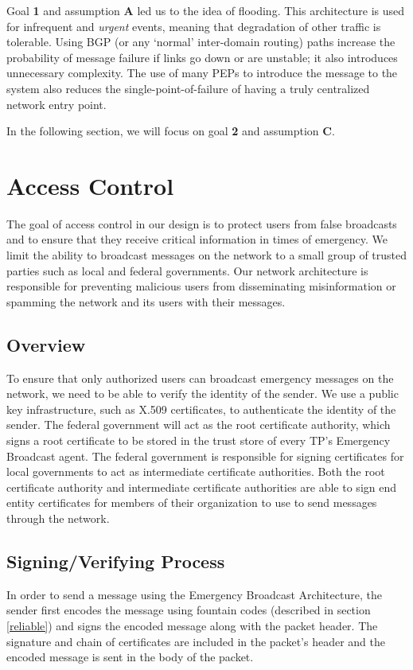 Goal \textbf{1} and assumption \textbf{A} led us to the idea of flooding. This architecture is used for infrequent and \textit{urgent} events, meaning that degradation of other traffic is tolerable. Using BGP (or any `normal' inter-domain routing) paths increase the probability of message failure if links go down or are unstable; it also introduces unnecessary complexity. The use of many PEPs to introduce the message to the system also reduces the single-point-of-failure of having a truly centralized network entry point.

In the following section, we will focus on goal \textbf{2} and assumption \textbf{C}. 

\section{Access Control}\label{acl}
The goal of access control in our design is to protect users from false broadcasts and to ensure that they receive critical information in times of emergency. We limit the ability to broadcast messages on the network to a small group of trusted parties such as local and federal governments. Our network architecture is responsible for preventing malicious users from disseminating misinformation or spamming the network and its users with their messages.
\subsection{Overview}
To ensure that only authorized users can broadcast emergency messages on the network, we need to be able to verify the identity of the sender. We use a public key infrastructure, such as X.509 certificates\cite{x509}, to authenticate the identity of the sender. The federal government will act as the root certificate authority, which signs a root certificate to be stored in the trust store of every TP's Emergency Broadcast agent. The federal government is responsible for signing certificates for local governments to act as intermediate certificate authorities. Both the root certificate authority and intermediate certificate authorities are able to sign end entity certificates for members of their organization to use to send messages through the network.
\subsection{Signing/Verifying Process}
In order to send a message using the Emergency Broadcast Architecture, the sender first encodes the message using fountain codes (described in section \ref{reliable}) and signs the encoded message along with the packet header. The signature and chain of certificates are included in the packet's header and the encoded message is sent in the body of the packet. 

